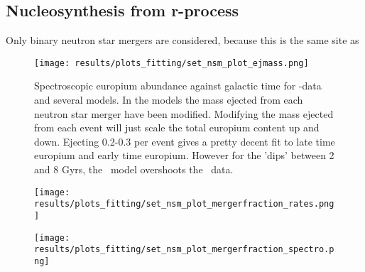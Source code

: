 \subsection{Nucleosynthesis from r-process}
Only binary neutron star mergers are considered, because this is the same site as 
\begin{figure}[h]
  \centering
  \texttt{[image: results/plots\_fitting/set\_nsm\_plot\_ejmass.png]}
  \caption{\label{fig:fit-v3-ejecta}
    Spectroscopic europium abundance against galactic time for \eris-data and several \omegamodel models. In the models the mass ejected from each neutron star merger have been modified.
    Modifying the mass ejected from each event will just scale the total europium content up and down.
    Ejecting 0.2-0.3 \msol per event gives a pretty decent fit to late time europium and early time europium.
    However for the 'dips' between 2 and 8 Gyrs, the \omegamodel\ model overshoots the \eris\ data.
  }
\end{figure}
\begin{figure}[h]
  \centering
  \texttt{[image: results/plots\_fitting/set\_nsm\_plot\_mergerfraction\_rates.png]}
  \caption{\label{fig:fit-v3-mergerfrac-nsmr}}
\end{figure}
\begin{figure}[h]
  \centering
  \texttt{[image: results/plots\_fitting/set\_nsm\_plot\_mergerfraction\_spectro.png]}
  \caption{\label{fig:fit-v3-mergerfrac-euro}}
\end{figure}
